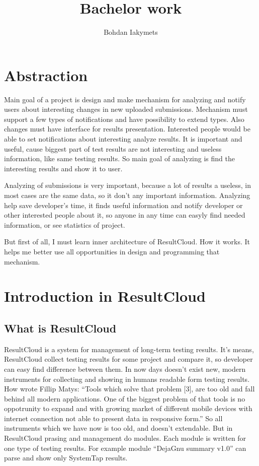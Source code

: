 \documentclass[a4paper,11pt]{article}
\title{Bachelor work \\[1mm]}
\author{Bohdan Iakymets \\ \email{xiakym00@stud.fit.vutbr.cz}}
\date{}
\begin{document}
\maketitle
\section{Abstraction}

Main goal of a project is design and make mechanism for analyzing and notify users about interesting changes in new uploaded submissions. Mechanism must support a few types of notifications and have possibility to extend types. Also changes must have interface for results presentation. Interested people would be able to set notifications about interesting analyze results.
It is important and useful, cause biggest part of test results are not interesting and useless information, like same testing results. So main goal of analyzing is find the interesting results and show it to user.

Analyzing of submissions is very important, because a lot of results a useless, in most cases are the same data, so it don't any important information. Analyzing help save developer's time, it finds useful information and notify developer or other interested people about it, so anyone in any time can easyly find needed information, or see statistics of project.

But first of all, I must learn inner architecture of ResultCloud. How it works. It helps me better use all opportunities in design and programming that mechanism.

\section{Introduction in ResultCloud}
\subsection{What is ResultCloud}

ResultCloud is a system for management of long-term testing results. It's means, ResultCloud collect testing results for some project and compare it, so developer can easy find difference between them. In now days doesn't exist new, modern instruments for collecting and showing in humans readable form testing results. How wrote Fillip Matys: “Tools which solve that problem [3], are too old and fall behind all modern applications. One of the biggest problem of that tools is no oppotrunity to expand and with growing market of different mobile devices with internet connection not able to present data in responsive form.” So all instruments which we have now is too old, and doesn't extendable. But in ResultCloud prasing and management do modules. Each module is written for one type of testing results. For example module “DejaGnu summary v1.0” can parse and show only SystemTap results. 
\end{document}
